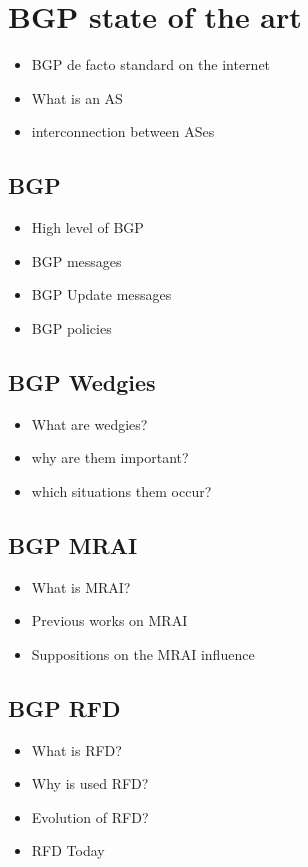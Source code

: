 \chapter{BGP state of the art}
\label{cha:bgp_art}

\begin{itemize}
    \item BGP de facto standard on the internet
    \item What is an AS
    \item interconnection between ASes
\end{itemize}

\section{BGP}
\label{sec:bgp_intro}

\begin{itemize}
    \item High level of BGP
    \item BGP messages
    \item BGP Update messages
    \item BGP policies
\end{itemize}

\section{BGP Wedgies}
\label{sec:bgp_wedgies}

\begin{itemize}
    \item What are wedgies?
    \item why are them important?
    \item which situations them occur?
\end{itemize}

\section{BGP MRAI}
\label{sec:bgp_mrai}

\begin{itemize}
    \item What is MRAI?
    \item Previous works on MRAI
    \item Suppositions on the MRAI influence
\end{itemize}

\section{BGP RFD}
\label{sec:bgp_rfd}

\begin{itemize}
    \item What is RFD?
    \item Why is used RFD?
    \item Evolution of RFD?
    \item RFD Today
\end{itemize}